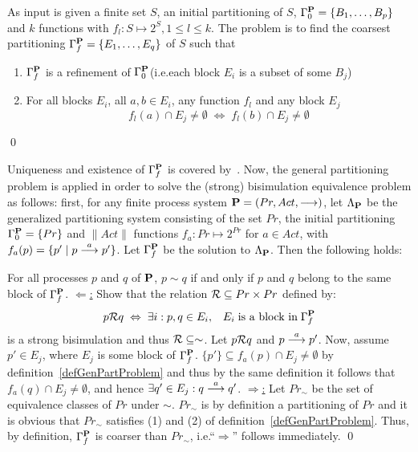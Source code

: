 \begin{definition}\label{defGenPartProblem}
As input is given a finite set $S$, an initial partitioning of $S$, $\Gamma^{\bf P}_0 = \{B_1,\ldots,B_p\}$ and $k$ functions with $f_l: S\mapsto 2^S, 1\leq l\leq k$. The problem is to find the coarsest partitioning $\Gamma^{\bf P}_f = \{ E_1,\ldots,E_q\}$ of $S$ such that
\begin{enumerate}
\item $\Gamma^{\bf P}_f$ is a refinement of $\Gamma^{\bf P}_0$\hfill\hbox{}\linebreak[4]
(i.e.\@ each block $E_i$ is a subset of some $B_j$)
\item For all blocks $E_i$, all $a,b\in E_i$, any function $f_l$ and any block $E_j$
\[
f_l(a)\cap E_j\not= \emptyset\;\Leftrightarrow\; f_l(b)\cap E_j\not=\emptyset
\]
\end{enumerate}
\qed
\end{definition}

Uniqueness and existence of $\Gamma^{\bf P}_f$ is covered by~\cite{Larsen}. Now, the general partitioning problem is applied in order to solve the (strong) bisimulation equivalence problem as follows: first, for any finite process system ${\bf P} = (Pr,Act,\stackrel{}{\longrightarrow})$, let $\Lambda_{\bf P}$ be the generalized partitioning system consisting of the set $Pr$, the initial partitioning $\Gamma^{\bf P}_0 = \{Pr\}$ and $\|Act\|$ functions $f_a: Pr\mapsto 2^{Pr}$ for $a\in Act$, with $f_a(p) = \{p'\mid p\stackrel{a}{\longrightarrow}p'\}$. Let $\Gamma^{\bf P}_f$ be the solution to $\Lambda_{\bf P}$. Then the following holds:

\begin{theorem}
For all processes $p$ and $q$ of $\bf P$, $p\sim q$ if and only if $p$ and $q$ belong to the same block of $\Gamma^{\bf P}_f$.
\proof\linebreak[4]
\underline{$\Leftarrow$:} Show that the relation ${\cal R}\subseteq Pr\times Pr$ defined by:
\[
p{\cal R}q\;\Leftrightarrow\; \exists i: p,q\in E_{i},\;\;\; E_i\; \hbox{is a block in}\;\Gamma^{\bf P}_f
\]
is a strong bisimulation and thus ${\cal R}\subseteq\sim$. Let $p{\cal R}q$ and $p\stackrel{a}{\longrightarrow}p'$. Now, assume $p'\in E_j$, where $E_j$ is some block of $\Gamma^{\bf P}_f$. $\{p'\}\subseteq f_a(p)\cap E_j \not=\emptyset$ by definition~\ref{defGenPartProblem} and thus by the same definition it follows that $f_a(q)\cap E_j\not=\emptyset$, and hence $\exists q'\in E_j: q\stackrel{a}{\longrightarrow}q'$.
\hfill\hbox{}\linebreak[4]
\underline{$\Rightarrow$:} Let $Pr_\sim$ be the set of equivalence classes of $Pr$ under $\sim$. $Pr_\sim$ is by definition a partitioning of $Pr$ and it is obvious that $Pr_\sim$ satisfies (1) and (2) of definition~\ref{defGenPartProblem}. Thus, by definition, $\Gamma^{\bf P}_f$ is coarser than $Pr_\sim$, i.e.\@ ``$\Rightarrow$'' follows immediately.
\qed
\end{theorem}

